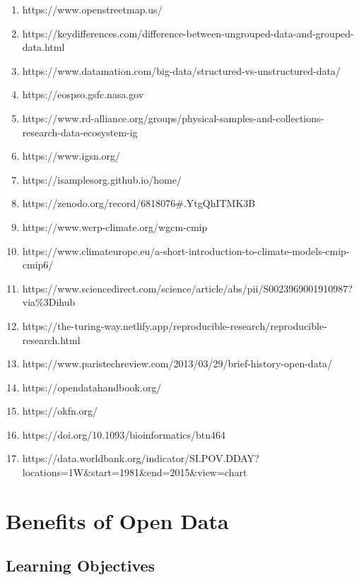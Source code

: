 \documentclass[
  letterpaper,
  DIV=11,
  numbers=noendperiod]{scrreport}
\providecommand{\tightlist}{%
  \setlength{\itemsep}{0pt}\setlength{\parskip}{0pt}}\usepackage{longtable,booktabs,array}
\begin{document}
\begin{enumerate}
\def\labelenumi{\arabic{enumi}.}
\tightlist
\item
  https://www.openstreetmap.us/
\item
  https://keydifferences.com/difference-between-ungrouped-data-and-grouped-data.html
\item
  https://www.datamation.com/big-data/structured-vs-unstructured-data/
\item
  https://eospso.gsfc.nasa.gov
\item
  https://www.rd-alliance.org/groups/physical-samples-and-collections-research-data-ecosystem-ig
\item
  https://www.igsn.org/
\item
  https://isamplesorg.github.io/home/
\item
  https://zenodo.org/record/6818076\#.YtgQhITMK3B
\item
  https://www.wcrp-climate.org/wgcm-cmip
\item
  https://www.climateurope.eu/a-short-introduction-to-climate-models-cmip-cmip6/
\item
  https://www.sciencedirect.com/science/article/abs/pii/S0023969001910987?via\%3Dihub
\item
  https://the-turing-way.netlify.app/reproducible-research/reproducible-research.html
\item
  https://www.paristechreview.com/2013/03/29/brief-history-open-data/
\item
  https://opendatahandbook.org/
\item
  https://okfn.org/
\item
  https://doi.org/10.1093/bioinformatics/btn464\\
\item
  https://data.worldbank.org/indicator/SI.POV.DDAY?locations=1W\&start=1981\&end=2015\&view=chart
\end{enumerate}

\hypertarget{benefits-of-open-data}{%
\chapter{Benefits of Open Data}\label{benefits-of-open-data}}

\hypertarget{learning-objectives}{%
\section{Learning Objectives}\label{learning-objectives}}
\end{document}
